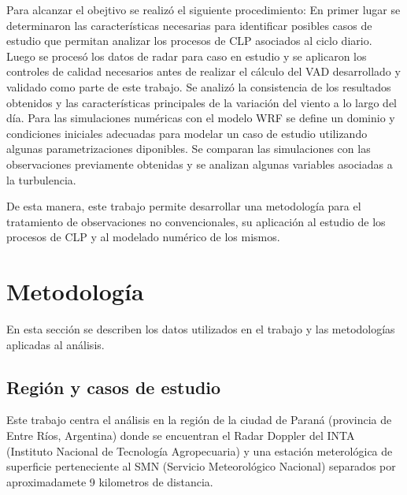\documentclass[12pt,spanish,oneside]{book}
\begin{document}
Para alcanzar el obejtivo se realizó el siguiente procedimiento: En
primer lugar se determinaron las características necesarias para
identificar posibles casos de estudio que permitan analizar los procesos
de CLP asociados al ciclo diario. Luego se procesó los datos de radar
para caso en estudio y se aplicaron los controles de calidad necesarios
antes de realizar el cálculo del VAD desarrollado y validado como parte
de este trabajo. Se analizó la consistencia de los resultados obtenidos
y las características principales de la variación del viento a lo largo
del día. Para las simulaciones numéricas con el modelo WRF se define un
dominio y condiciones iniciales adecuadas para modelar un caso de
estudio utilizando algunas parametrizaciones diponibles. Se comparan las
simulaciones con las observaciones previamente obtenidas y se analizan
algunas variables asociadas a la turbulencia.

De esta manera, este trabajo permite desarrollar una metodología para el
tratamiento de observaciones no convencionales, su aplicación al estudio
de los procesos de CLP y al modelado numérico de los mismos.

\chapter{Metodología}\label{metodologia}

En esta sección se describen los datos utilizados en el trabajo y las
metodologías aplicadas al análisis.

\section{Región y casos de estudio}\label{region-y-casos-de-estudio}

Este trabajo centra el análisis en la región de la ciudad de Paraná
(provincia de Entre Ríos, Argentina) donde se encuentran el Radar
Doppler del INTA (Instituto Nacional de Tecnología Agropecuaria) y una
estación meterológica de superficie perteneciente al SMN (Servicio
Meteorológico Nacional) separados por aproximadamete 9 kilometros de
distancia.
\end{document}
